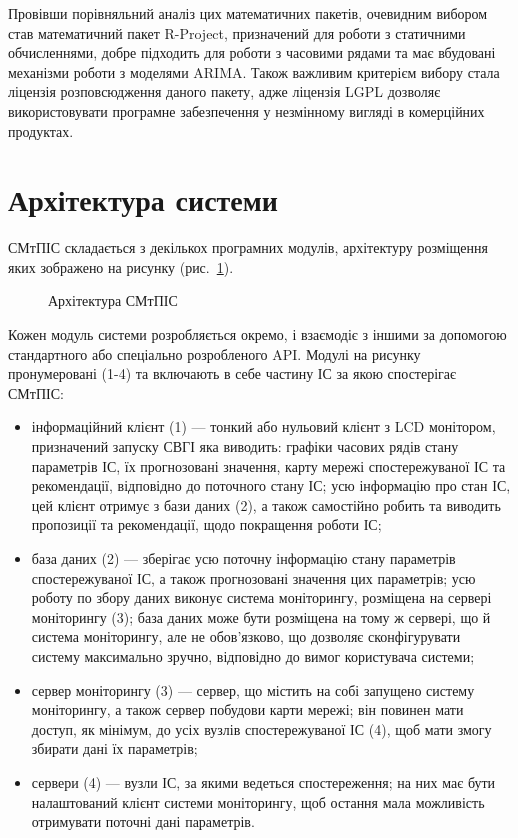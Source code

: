 \documentclass{thesis_utf8}
\begin{document}
Провівши порівняльний аналіз цих математичних пакетів, очевидним вибором став математичний пакет R-Project, призначений для роботи з статичними обчисленнями, добре підходить для роботи з часовими рядами та має вбудовані механізми роботи з моделями ARIMA. Також важливим критерієм вибору стала ліцензія розповсюдження даного пакету, адже ліцензія LGPL \cite{book:lgpl} дозволяє використовувати програмне забезпечення у незмінному вигляді в комерційних продуктах.

\section{Архітектура системи}

СМтПІС складається з декількох програмних модулів, архітектуру розміщення яких зображено на рисунку (рис.~\ref{fig:archit}).

\begin{figure}[!h]
    \centering
    \caption{Архітектура СМтПІС}
    \label{fig:archit}
\end{figure}

Кожен модуль системи розробляється окремо, і взаємодіє з іншими за допомогою стандартного або спеціально розробленого API. Модулі на рисунку пронумеровані (1-4) та включають в себе частину ІС за якою спостерігає СМтПІС:
\begin{itemize}
    \item інформаційний клієнт (1) --- тонкий %
        або нульовий %
        клієнт з LCD монітором, призначений запуску СВГІ яка виводить: графіки часових рядів стану параметрів ІС, їх прогнозовані значення, карту мережі спостережуваної ІС та рекомендації, відповідно до поточного стану ІС; усю інформацію про стан ІС, цей клієнт отримує з бази даних (2), а також самостійно робить та виводить пропозиції та рекомендації, щодо покращення роботи ІС;
    \item база даних (2) --- зберігає усю поточну інформацію стану параметрів спостережуваної ІС, а також прогнозовані значення цих параметрів; усю роботу по збору даних виконує система моніторингу, розміщена на сервері моніторингу (3); база даних може бути розміщена на тому ж сервері, що й система моніторингу, але не обов'язково, що дозволяє сконфігурувати систему максимально зручно, відповідно до вимог користувача системи;
    \item сервер моніторингу (3) --- сервер, що містить на собі запущено систему моніторингу, а також сервер побудови карти мережі; він повинен мати доступ, як мінімум, до усіх вузлів спостережуваної ІС (4), щоб мати змогу збирати дані їх параметрів;
    \item сервери (4) --- вузли ІС, за якими ведеться спостереження; на них має бути налаштований клієнт системи моніторингу, щоб остання мала можливість отримувати поточні дані параметрів.
\end{itemize}
\end{document}
